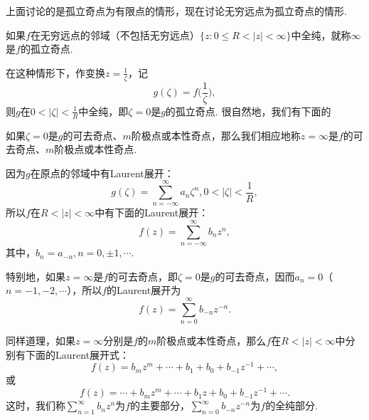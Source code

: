 上面讨论的是孤立奇点为有限点的情形，现在讨论无穷远点为孤立奇点的情形.

如果$f$在无穷远点的邻域（不包括无穷远点）$\{z:0\le R<|z|<\infty\}$中全纯，就称$\infty$是$f$的孤立奇点.

在这种情形下，作变换$z=\frac1\zeta$，记
\[g(\zeta)=f\bigg(\frac1\zeta\bigg),\]
则$g$在$0<|\zeta|<\frac1R$中全纯，即$\zeta=0$是$g$的孤立奇点. 很自然地，我们有下面的
\begin{definition}\label{def5.2.7}
如果$\zeta=0$是$g$的可去奇点、$m$阶极点或本性奇点，那么我们相应地称$z=\infty$是$f$的可去奇点、$m$阶极点或本性奇点.
\end{definition}

因为$g$在原点的邻域中有Laurent展开：
\[g(\zeta)=\sum_{n=-\infty}^\infty a_n\zeta^n,0<|\zeta|<\frac1R,\]
所以$f$在$R<|z|<\infty$中有下面的Laurent展开：
\[f(z)=\sum_{n=-\infty}^\infty b_nz^n,\]
其中，$b_n=a_{-n},n=0,\pm1,\cdots$.

特别地，如果$z=\infty$是$f$的可去奇点，即$\zeta=0$是$g$的可去奇点，因而$a_n=0$（$n=-1,-2,\cdots$），所以$f$的Laurent展开为
\begin{equation}\label{eq5.2.3}
f(z)=\sum_{n=0}^\infty b_{-n}z^{-n}.
\end{equation}

同样道理，如果$z=\infty$分别是$f$的$m$阶极点或本性奇点，那么$f$在$R<|z|<\infty$中分别有下面的Laurent展开式：
\begin{equation}\label{eq5.2.4}
f(z)=b_mz^m+\cdots+b_1+b_0+b_{-1}z^{-1}+\cdots,
\end{equation}
或
\begin{equation}\label{eq5.2.5}
f(z)=\cdots+b_mz^m+\cdots+b_1z+b_0+b_{-1}z^{-1}+\cdots.
\end{equation}
这时，我们称$\sum_{n=1}^\infty b_nz^n$为$f$的主要部分，$\sum_{n=0}^\infty b_{-n}z^{-n}$为$f$的全纯部分.

